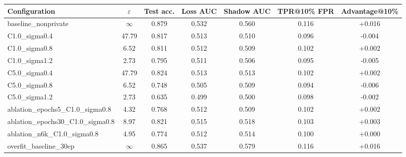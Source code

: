 \setlength{\tabcolsep}{4pt}
\begin{tabular}{lcccccc}
\toprule
Configuration & $\varepsilon$ & Test acc. & Loss AUC & Shadow AUC & TPR@10\% FPR & Advantage@10\% \\
\midrule
baseline\_nonprivate & $\infty$ & 0.879 & 0.532 & 0.560 & 0.116 & +0.016 \\
C1.0\_sigma0.4 & 47.79 & 0.817 & 0.513 & 0.510 & 0.096 & -0.004 \\
C1.0\_sigma0.8 & 6.52 & 0.811 & 0.512 & 0.509 & 0.102 & +0.002 \\
C1.0\_sigma1.2 & 2.73 & 0.795 & 0.511 & 0.506 & 0.095 & -0.005 \\
C5.0\_sigma0.4 & 47.79 & 0.824 & 0.513 & 0.513 & 0.102 & +0.002 \\
C5.0\_sigma0.8 & 6.52 & 0.748 & 0.505 & 0.509 & 0.094 & -0.006 \\
C5.0\_sigma1.2 & 2.73 & 0.635 & 0.499 & 0.500 & 0.098 & -0.002 \\
ablation\_epochs5\_C1.0\_sigma0.8 & 4.32 & 0.768 & 0.512 & 0.509 & 0.102 & +0.002 \\
ablation\_epochs30\_C1.0\_sigma0.8 & 8.97 & 0.821 & 0.515 & 0.518 & 0.103 & +0.003 \\
ablation\_n6k\_C1.0\_sigma0.8 & 4.95 & 0.774 & 0.512 & 0.514 & 0.100 & +0.000 \\
overfit\_baseline\_30ep & $\infty$ & 0.865 & 0.537 & 0.579 & 0.116 & +0.016 \\
\bottomrule
\end{tabular}
